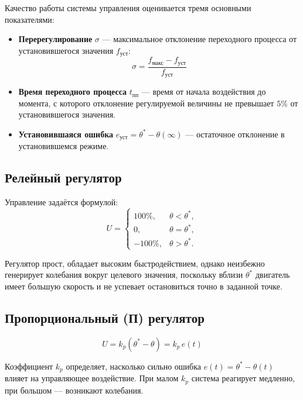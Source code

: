 \documentclass[a4paper, 12pt]{article}
\begin{document}
Качество работы системы управления оценивается тремя основными показателями:

\begin{itemize}
    \item \textbf{Перерегулирование} $\sigma$ --- максимальное отклонение переходного
    процесса от установившегося значения $f_{\text{уст}}$:
    \begin{equation}
        \sigma = \frac{f_{\text{макс}} - f_{\text{уст}}}{f_{\text{уст}}}
    \end{equation}
    \item \textbf{Время переходного процесса} $t_{\text{пп}}$ --- время от начала
    воздействия до момента, с которого отклонение регулируемой величины не превышает $5\%$
    от установившегося значения.
    \item \textbf{Установившаяся ошибка} $e_{\text{уст}} = \theta^* - \theta(\infty)$ ---
    остаточное отклонение в установившемся режиме.
\end{itemize}

\subsection{Релейный регулятор}

Управление задаётся формулой:
\begin{equation}
U = \begin{cases}
100\%, & \theta < \theta^*, \\
0,    & \theta = \theta^*, \\
-100\%, & \theta > \theta^*.
\end{cases}
\end{equation}

Регулятор прост, обладает высоким быстродействием, однако неизбежно генерирует колебания
вокруг целевого значения, поскольку вблизи $\theta^*$ двигатель имеет большую скорость
и не успевает остановиться точно в заданной точке.

\subsection{Пропорциональный (П) регулятор}

\begin{equation}
U = k_p(\theta^* - \theta) = k_p\, e(t)
\end{equation}

Коэффициент $k_p$ определяет, насколько сильно ошибка $e(t) = \theta^* - \theta(t)$
влияет на управляющее воздействие. При малом $k_p$ система реагирует медленно, при
большом --- возникают колебания.
\end{document}
